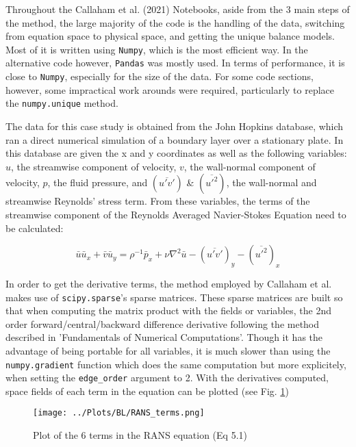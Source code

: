 \documentclass[12pt]{report} %
\begin{document}
Throughout the Callaham et al. (2021)\cite{callaham2021learning} Notebooks, aside from the 3 main steps of the method, the large majority of the code is the handling of the data, switching from equation space to physical space, and getting the unique balance models. Most of it is written using \texttt{Numpy}, which is the most efficient way. In the alternative code however, \texttt{Pandas} was mostly used. In terms of performance, it is close to \texttt{Numpy}, especially for the size of the data. For some code sections, however, some impractical work arounds were required, particularly to replace the \texttt{numpy.unique} method.

The data for this case study is obtained from the John Hopkins database, which ran a direct numerical simulation of a boundary layer over a stationary plate\cite{jhtdb}. In this database are given the x and y coordinates as well as the following variables: $u$, the streamwise component of velocity, $v$, the wall-normal component of velocity, $p$, the fluid pressure, and $(\overline{u' v'})$ \& $(\overline{u'^2})$, the wall-normal and streamwise Reynolds' stress term. From these variables, the terms of the streamwise component of the Reynolds Averaged Navier-Stokes Equation need to be calculated:

\begin{equation}
  \bar{u} \bar{u}_x + \bar{v} \bar{u}_y = \rho^{-1} \bar{p}_x + \nu \nabla^2 \bar{u}  - (\overline{u' v'})_y - (\overline{u'^2})_x
\end{equation}

In order to get the derivative terms, the method employed by Callaham et al. makes use of \texttt{scipy.sparse}'s sparse matrices. These sparse matrices are built so that when computing the matrix product with the fields or variables, the 2nd order forward/central/backward difference derivative following the method described in 'Fundamentals of Numerical Computations'\cite{finitediff}. Though it has the advantage of being portable for all variables, it is much slower than using the \texttt{numpy.gradient} function which does the same computation but more explicitely, when setting the \texttt{edge\_order} argument to 2. With the derivatives computed, space fields of each term in the equation can be plotted (see Fig. \ref{fig:RANS_terms})

\begin{figure}
  \centering
  \texttt{[image: ../Plots/BL/RANS\_terms.png]}
  \caption{Plot of the 6 terms in the RANS equation (Eq 5.1)}
  \label{fig:RANS_terms}
\end{figure}
\end{document}
